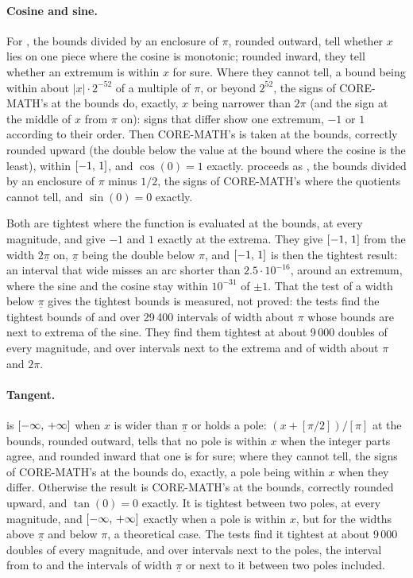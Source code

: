 \paragraph{Cosine and sine.}
For , the bounds divided by an enclosure of $\pi$, rounded
outward, tell whether $x$ lies on one piece where the cosine is monotonic;
rounded inward, they tell whether an extremum is within $x$ for sure. Where
they cannot tell, a bound being within about $|x|\cdot2^{-52}$ of a
multiple of $\pi$, or beyond $2^{52}$, the signs of CORE-MATH's 
at the bounds do, exactly, $x$ being narrower than $2\pi$ (and the sign at
the middle of $x$ from $\pi$ on): signs that differ show one extremum, $-1$
or $1$ according to their order. Then CORE-MATH's  is taken at
the bounds, correctly rounded upward (the double below the value at the
bound where the cosine is the least), within $[-1,\,1]$, and $\cos(0)=1$ exactly. 
proceeds as , the bounds divided by an enclosure of $\pi$ minus
$1/2$, the signs of CORE-MATH's  where the quotients cannot tell,
and $\sin(0)=0$ exactly.

Both are tightest where the function is evaluated at the bounds, at every
magnitude, and give $-1$ and $1$ exactly at the extrema. They give
$[-1,\,1]$ from the width $2\underline{\pi}$ on, $\underline{\pi}$ being
the double below $\pi$, and $[-1,\,1]$ is then the tightest result: an interval that wide misses an arc shorter than $2.5\cdot10^{-16}$, around an extremum, where the sine and the cosine stay within $10^{-31}$ of $\pm1$. That the test of a width below
$\underline{\pi}$ gives the tightest bounds is measured, not proved: the
tests find the tightest bounds of  and  over 29\,400
intervals of width about $\pi$ whose bounds are next to extrema of the
sine. They find them tightest at about 9\,000 doubles of every magnitude, and over intervals next to
the extrema and of width about $\pi$ and $2\pi$.

\paragraph{Tangent.}
 is $[-\infty,\,+\infty]$ when $x$ is wider than
$\underline{\pi}$ or holds a pole: $(x+[\pi/2])/[\pi]$ at the bounds,
rounded outward, tells that no pole is within $x$ when the integer parts
agree, and rounded inward that one is for sure; where they cannot tell, the
signs of CORE-MATH's  at the bounds do, exactly, a pole being
within $x$ when they differ. Otherwise the result is CORE-MATH's 
at the bounds, correctly rounded upward, and $\tan(0)=0$ exactly. It is
tightest between two poles, at every magnitude, and
$[-\infty,\,+\infty]$ exactly when a pole is within $x$, but for the
widths above $\underline{\pi}$ and below $\pi$, a theoretical case. The
tests find it tightest at about 9\,000 doubles of every magnitude, and over intervals next to the
poles, the interval from  to  and the
intervals of width $\underline{\pi}$ or next to it between two poles
included.

